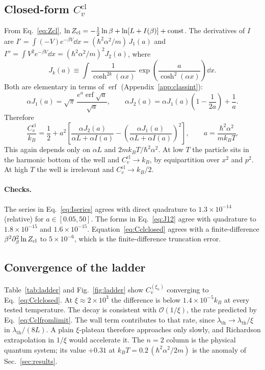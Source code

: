 \documentclass[11pt]{article}
\numberwithin{equation}{section}
\providecommand{\erf}{\operatorname{erf}}
\newcommand{\lth}{\lambda_{\mathrm{th}}}
\newcommand{\Ccl}{C_v^{\mathrm{cl}}}
\newcommand{\kB}{k_{B}}
\begin{document}
\subsection{Closed-form \texorpdfstring{$\Ccl$}{Ccl}}
From Eq.~\eqref{eq:Zcl}, $\ln Z_{\rm cl}=-\tfrac12\ln\beta+\ln[L+I(\beta)]+\text{const}$. The derivatives of $I$ are $I'=\int(-V)e^{-\beta V}\dd x=(\hbar^2\alpha^2/m)\,J_1(a)$ and $I''=\int V^2e^{-\beta V}\dd x=(\hbar^2\alpha^2/m)^2J_2(a)$, where
\[
J_k(a)\equiv\int\frac{1}{\cosh^{2k}(\alpha x)}\,\exp\!\left(\frac{a}{\cosh^2(\alpha x)}\right)\dd x .
\]
Both are elementary in terms of $\erf$ (Appendix~\ref{app:classint}):
\begin{equation}
\alpha J_1(a)=\sqrt\pi\,\frac{e^a\erf\sqrt a}{\sqrt a},\qquad
\alpha J_2(a)=\alpha J_1(a)\left(1-\frac{1}{2a}\right)+\frac1a .
\label{eq:J12}
\end{equation}
Therefore
\begin{equation}
\boxed{\;\frac{\Ccl}{\kB}=\frac12+a^2\left[\frac{\alpha J_2(a)}{\alpha L+\alpha I(a)}-\left(\frac{\alpha J_1(a)}{\alpha L+\alpha I(a)}\right)^2\right],\qquad a=\frac{\hbar^2\alpha^2}{m\kB T}.\;}
\label{eq:Cclclosed}
\end{equation}
This again depends only on $\alpha L$ and $2m\kB T/\hbar^2\alpha^2$. At low $T$ the particle sits in the harmonic bottom of the well and $\Ccl\to\kB$, by equipartition over $x^2$ and $p^2$. At high $T$ the well is irrelevant and $\Ccl\to\kB/2$.

\paragraph{Checks.} The series in Eq.~\eqref{eq:Iseries} agrees with direct quadrature to $1.3\times10^{-14}$ (relative) for $a\in[0.05,50]$. The forms in Eq.~\eqref{eq:J12} agree with quadrature to $1.8\times10^{-15}$ and $1.6\times10^{-15}$. Equation~\eqref{eq:Cclclosed} agrees with a finite-difference $\beta^2\partial_\beta^2\ln Z_{\rm cl}$ to $5\times10^{-6}$, which is the finite-difference truncation error.

\subsection{Convergence of the ladder}
Table~\ref{tab:ladder} and Fig.~\ref{fig:ladder} show $C_v^{(\xi_n)}$ converging to Eq.~\eqref{eq:Cclclosed}. At $\xi\approx2\times10^3$ the difference is below $1.4\times10^{-5}\kB$ at every tested temperature. The decay is consistent with $\mathcal O(1/\xi)$, the rate predicted by Eq.~\eqref{eq:Cclfromlimit}. The wall term contributes to that rate, since $\lth\to\lth/\xi$ in $\lth/(8L)$. A plain $\xi$-plateau therefore approaches only slowly, and Richardson extrapolation in $1/\xi$ would accelerate it. The $n=2$ column is the physical quantum system; its value $+0.31$ at $\kB T=0.2\,(\hbar^2\alpha^2/2m)$ is the anomaly of Sec.~\ref{sec:results}.
\end{document}

